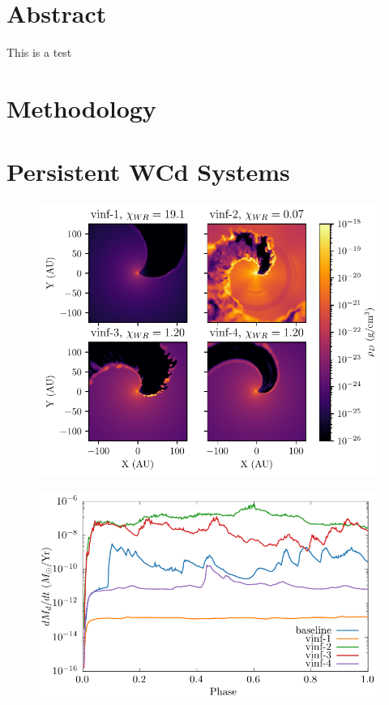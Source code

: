 \documentclass[portrait,a0]{a0poster}
\begin{document}
    \begin{multicols}{2}
      \section*{Abstract}
      This is a test

      \section*{Methodology}

      \section*{Persistent WCd Systems}

      \begin{figure}[H]
        \centering
        \includegraphics[width=\linewidth]{assets/vinf-finished-rhod.pdf}
      \end{figure}

      \begin{figure}[H]
        \centering
        \includegraphics[width=\linewidth]{assets/vinf-phase-dust_rate.pdf}
      \end{figure}


\end{multicols}
\end{document}
